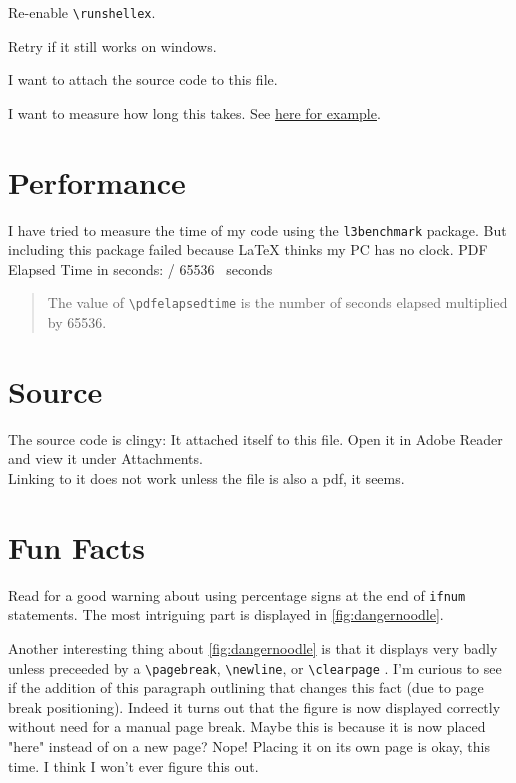 \documentclass{article} \usepackage[utf8]{inputenc}
\newcommand{\code}[1]{\colorbox{codebggray}{{\texttt{#1}}}}
\begin{document}
Re-enable \code{\textbackslash runshellex}.

Retry if it still works on windows.

I want to attach the source code to this file.

I want to measure how long this takes. See \href{https://tex.stackexchange.com/questions/505770/how-to-measure-the-compilation-time-of-a-document?rq=1}{here for example}.
\section{Performance}
I have tried to measure the time of my code using the \code{l3benchmark} package. But including this package failed because LaTeX thinks my PC has no clock.
PDF Elapsed Time in seconds: \the\numexpr \pdfelapsedtime / 65536 \relax ~seconds
\begin{myquote}\begin{quote}
The value of \code{\textbackslash pdfelapsedtime} is the number of seconds elapsed multiplied by 65536. 
\end{quote}\end{myquote}

\section{Source}
The source code is clingy: It attached itself to this file. Open it in Adobe Reader and view it under Attachments.\\
Linking to it does not work unless the file is also a pdf, it seems.

\section{Fun Facts}
Read  for a good warning about using percentage signs at the end of \code{ifnum} statements. The most intriguing part is displayed in \autoref{fig:dangernoodle}.

Another interesting thing about \autoref{fig:dangernoodle} is that it displays very badly unless preceeded by a \code{\textbackslash pagebreak}, \code{\textbackslash newline}, or \code{\textbackslash clearpage} . I'm curious to see if the addition of this paragraph outlining that changes this fact (due to page break positioning).
Indeed it turns out that the figure is now displayed correctly without need for a manual page break. Maybe this is because it is now placed "here" instead of on a new page? Nope! Placing it on its own page is okay, this time. I think I won't ever figure this out.
\end{document}

